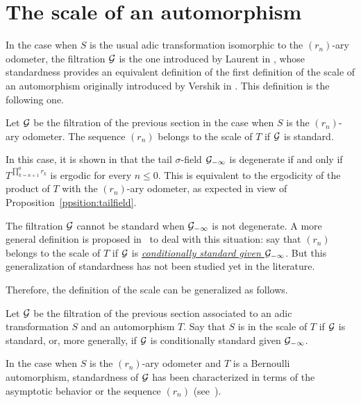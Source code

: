 \documentclass[12pt,a4paper]{article}
\begin{document}
\section{The scale of an automorphism}

In the case when $S$ is the usual adic transformation isomorphic to 
the $(r_n)$-ary odometer, 
the filtration $\mathcal{G}$ is the one introduced by Laurent in \cite{LauXLV}, 
whose standardness provides an equivalent definition of the first 
definition of the scale of an automorphism originally introduced by Vershik in \cite{thescale}. 
This definition is the following one. 

\begin{definition}
Let $\mathcal{G}$ be the filtration of the previous section in the case when 
$S$ is the $(r_n)$-ary odometer. 
The sequence $(r_n)$ belongs to the scale of $T$ if $\mathcal{G}$ is standard. 
\end{definition}

In this case, it is shown in \cite{LauXLV} that the tail $\sigma$-field $\mathcal{G}_{-\infty}$ 
is degenerate if and only if $T^{\prod_{k=n+1}^{0}r_k}$ is ergodic for every $n \leq 0$. 
This is equivalent to the ergodicity of the product of $T$ 
with the $(r_n)$-ary odometer, as expected in view of Proposition~\ref{ppsition:tailfield}. 

The filtration $\mathcal{G}$ cannot be standard when $\mathcal{G}_{-\infty}$ is not degenerate. 
A more general definition is proposed in~\cite{LauXLV} to deal with this situation: 
say that  $(r_n)$ belongs to the scale of $T$ if $\mathcal{G}$ is 
\uline{\emph{conditionally standard given $\mathcal{G}_{-\infty}$}}. 
But this generalization of standardness has not been studied yet in the literature. 

Therefore, the definition of the scale can be generalized as follows. 

\begin{definition}
Let $\mathcal{G}$ be the filtration of the previous section associated to an adic 
transformation $S$ and an automorphism $T$. Say that $S$ is in the scale 
of $T$ if $\mathcal{G}$ is standard, or, more generally, if $\mathcal{G}$ is conditionally standard 
given $\mathcal{G}_{-\infty}$. 
\end{definition}

In the case when $S$ is the $(r_n)$-ary odometer and 
$T$ is a Bernoulli automorphism, standardness of $\mathcal{G}$ 
has been characterized in terms of the asymptotic behavior or the 
sequence $(r_n)$ (see~\cite{Ceil, LauXLIII, LauXLV}).
\end{document}

